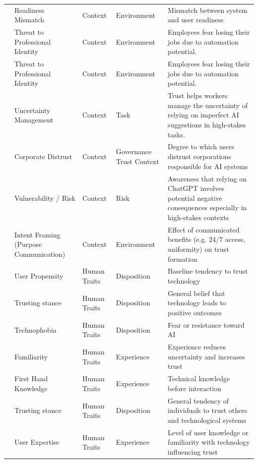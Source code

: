 \documentclass[sigconf]{acmart}
\begin{document}
\begin{longtable}{l l l l p{4cm}}
\cite{bach_systematic_literature_review} & Readiness Mismatch & Context & Environment & Mismatch between system and user readiness \\
\cite{banh2023generative} & Threat to Professional Identity & Context & Environment & Employees fear losing their jobs due to automation potential. \\
\cite{arlasan_artificial_intelligence} & Threat to Professional Identity & Context & Environment & Employees fear losing their jobs due to automation potential. \\
\cite{choudhury_asan_2020_trust_clinicians} & Uncertainty Management & Context & Task & Trust helps workers manage the uncertainty of relying on imperfect AI suggestions in high-stakes tasks. \\
\cite{schepman_general_attitude} & Corporate Distrust & Context & Governance Trust Context & Degree to which users distrust corporations responsible for AI systems \\
\cite{choudhury_chat_gpt} & Vulnerability / Risk & Context & Risk & Awareness that relying on ChatGPT involves potential negative consequences especially in high-stakes contexts \\
\cite{aoki_chatbot_experimental} & Intent Framing (Purpose Communication) & Context & Environment & Effect of communicated benefits (e.g. 24/7 access, uniformity) on trust formation \\
\cite{SangseokYou_CathyLiuYang_Xitong_2022} & User Propensity & Human Traits & Disposition & Baseline tendency to trust technology \\
\cite{tussyadiah_do_travelers_trust} & Trusting stance & Human Traits & Disposition & General belief that technology leads to positive outcomes \\
\cite{What_factors_contribute_to_the_acceptance_of_artificial_intelligence} & Technophobia & Human Traits & Disposition & Fear or resistance toward AI \\
\cite{chi_formative_scale} & Familiarity & Human Traits & Experience & Experience reduces uncertainty and increases trust \\
\cite{zhang_automated_vehicle_acceptance} & First Hand Knowledge & Human Traits & Experience & Technical knowledge before interaction \\
\cite{schepman_general_attitude} & Trusting stance & Human Traits & Disposition & General tendency of individuals to trust others and technological systems \\
\cite{schepman_general_attitude} & User Expertise & Human Traits & Experience & Level of user knowledge or familiarity with technology influencing trust \\

\end{longtable}
\end{document}
